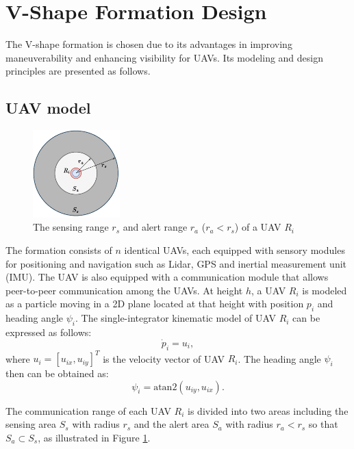 \section{V-Shape Formation Design} \label{sec:0design}
The V-shape formation is chosen due to its advantages in improving maneuverability and enhancing visibility for UAVs. Its modeling and design principles are presented as follows. 
\subsection{UAV model}
\begin{figure}
    \centering
    \includegraphics[width=0.3\textwidth]{paper1/images/model.pdf}
    \caption{The sensing range $r_s$ and alert range $r_a$ ($r_a<r_s$) of a UAV $R_i$}
    \label{fig:chap2_model}
\end{figure}
 
The formation consists of $n$ identical UAVs, each equipped with sensory modules for positioning and navigation such as Lidar, GPS and inertial measurement unit (IMU). The UAV is also equipped with a communication module that allows peer-to-peer communication among the UAVs. At height $h$, a UAV $R_i$ is modeled as a particle moving in a 2D plane located at that height with position $p_i$ and heading angle $\psi_i$. The single-integrator kinematic model of UAV $R_i$ can be expressed as follows:
\begin{equation}
    \dot{p}_i = u_i,
\end{equation}
where $u_i=[u_{ix},u_{iy}]^T$ is the velocity vector of UAV $R_i$. The heading angle $\psi_i$ then can be obtained as:
\begin{equation}
    \psi_i=\text{atan2}(u_{iy},u_{ix}).
\end{equation}

The communication range of each UAV $R_i$ is divided into two areas including the sensing area $S_s$ with radius $r_s$ and the alert area $S_a$ with radius $r_a<r_s$ so that $S_a\subset S_s$, as illustrated in Figure \ref{fig:chap2_model}.

